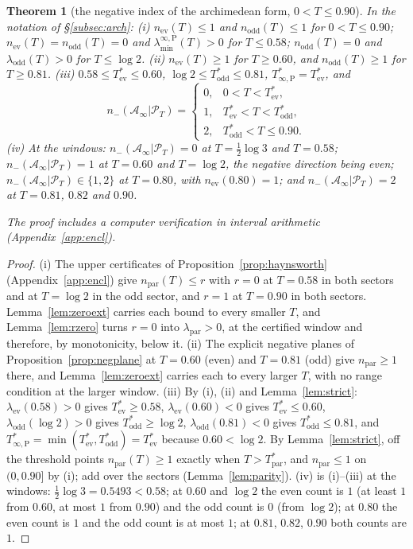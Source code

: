 \documentclass[11pt]{amsart}
\newtheorem{theorem}{Theorem}[section]
\theoremstyle{definition}
\theoremstyle{remark}
\newcommand{\PT}{\mathcal P_T}
\newcommand{\Ainf}{\mathcal A_\infty}
\newcommand{\laminfP}{\lambda^{\infty,\mathrm P}_{\min}}
\begin{document}
\begin{theorem}[the negative index of the archimedean form, $0<T\le0.90$]\label{thm:index}
In the notation of \S\ref{subsec:arch}:
\emph{(i)} $n_{\mathrm{ev}}(T)\le1$ and $n_{\mathrm{odd}}(T)\le1$ for $0<T\le0.90$;
$n_{\mathrm{ev}}(T)=n_{\mathrm{odd}}(T)=0$ and $\laminfP(T)>0$ for $T\le0.58$; $n_{\mathrm{odd}}(T)=0$
and $\lambda_{\mathrm{odd}}(T)>0$ for $T\le\log2$.
\emph{(ii)} $n_{\mathrm{ev}}(T)\ge1$ for $T\ge0.60$, and $n_{\mathrm{odd}}(T)\ge1$ for $T\ge0.81$.
\emph{(iii)} $0.58\le T^*_{\mathrm{ev}}\le0.60$, $\log2\le T^*_{\mathrm{odd}}\le0.81$,
$T^*_{\infty,\mathrm P}=T^*_{\mathrm{ev}}$, and
\[
n_-(\Ainf|\PT)=\begin{cases}0,&0<T<T^*_{\mathrm{ev}},\\ 1,&T^*_{\mathrm{ev}}<T<T^*_{\mathrm{odd}},\\
2,&T^*_{\mathrm{odd}}<T\le0.90.\end{cases}
\]
\emph{(iv)} At the windows: $n_-(\Ainf|\PT)=0$ at $T=\frac12\log3$ and $T=0.58$; $n_-(\Ainf|\PT)=1$ at
$T=0.60$ and $T=\log2$, the negative direction being even; $n_-(\Ainf|\PT)\in\{1,2\}$ at $T=0.80$,
with $n_{\mathrm{ev}}(0.80)=1$; and $n_-(\Ainf|\PT)=2$ at $T=0.81$, $0.82$ and $0.90$.

\noindent The proof includes a computer verification in interval arithmetic (Appendix~\ref{app:encl}).
\end{theorem}
\begin{proof}
(i) The upper certificates of Proposition~\ref{prop:haynsworth} (Appendix~\ref{app:encl}) give
$n_{\mathrm{par}}(T)\le r$ with $r=0$ at $T=0.58$ in both sectors and at $T=\log2$ in the odd sector,
and $r=1$ at $T=0.90$ in both sectors. Lemma~\ref{lem:zeroext} carries each bound to every smaller $T$,
and Lemma~\ref{lem:rzero} turns $r=0$ into $\lambda_{\mathrm{par}}>0$, at the certified window and
therefore, by monotonicity, below it. (ii) The explicit negative planes of
Proposition~\ref{prop:negplane} at $T=0.60$ (even) and $T=0.81$ (odd) give $n_{\mathrm{par}}\ge1$
there, and Lemma~\ref{lem:zeroext} carries each to every larger $T$, with no range condition at the
larger window. (iii) By (i), (ii) and Lemma~\ref{lem:strict}: $\lambda_{\mathrm{ev}}(0.58)>0$ gives
$T^*_{\mathrm{ev}}\ge0.58$, $\lambda_{\mathrm{ev}}(0.60)<0$ gives $T^*_{\mathrm{ev}}\le0.60$,
$\lambda_{\mathrm{odd}}(\log2)>0$ gives $T^*_{\mathrm{odd}}\ge\log2$, $\lambda_{\mathrm{odd}}(0.81)<0$
gives $T^*_{\mathrm{odd}}\le0.81$, and $T^*_{\infty,\mathrm P}=\min(T^*_{\mathrm{ev}},T^*_{\mathrm{odd}})
=T^*_{\mathrm{ev}}$ because $0.60<\log2$. By Lemma~\ref{lem:strict}, off the threshold points
$n_{\mathrm{par}}(T)\ge1$ exactly when $T>T^*_{\mathrm{par}}$, and $n_{\mathrm{par}}\le1$ on $(0,0.90]$
by (i); add over the sectors (Lemma~\ref{lem:parity}). (iv) is (i)--(iii) at the windows:
$\frac12\log3=0.5493<0.58$; at $0.60$ and $\log2$ the even count is $1$ (at least $1$ from $0.60$, at
most $1$ from $0.90$) and the odd count is $0$ (from $\log2$); at $0.80$ the even count is $1$ and the
odd count is at most $1$; at $0.81$, $0.82$, $0.90$ both counts are $1$.
\end{proof}
\end{document}
